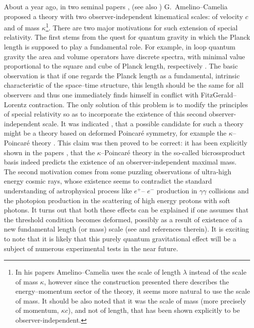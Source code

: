 \documentclass[a4paper,a4paper]{article}
\begin{document}
About a year ago, in two seminal papers \cite{gac1}, \cite{gac2}
(see also \cite{gacnew})  G.~Amelino--Camelia proposed a theory
with two observer-independent kinematical scales: of velocity $c$
and of mass $\kappa$\footnote{In his papers Amelino--Camelia  uses
the scale of length $\lambda$ instead of the scale of mass
$\kappa$, however since the construction presented there describes
the energy--momentum sector of the theory, it seems more natural
to use the scale of mass. It should be also noted that it was the
scale of mass (more precisely of momentum, $\kappa c$), and not of
length, that has been shown explicitly to be
observer-independent.}. There are two major motivations for such
extension of special relativity. The first stems from the quest
for quantum gravity in which the Planck length is supposed to play
a fundamental role. For example, in loop quantum gravity the area
and volume operators have discrete spectra, with minimal value
proportional to the square and cube of Planck length, respectively
\cite{RovSmo}. The basic observation is that if one regards the
Planck length as a fundamental, intrinsic characteristic of the
space--time structure, this length should be the same for all
observers and thus one immediately finds himself in conflict with
FitzGerald--Lorentz contraction. The only solution of this problem
is to modify the principles of special relativity so as to
incorporate the existence of this second observer-independent
scale. It was indicated \cite{gac1}, \cite{gac2} that a possible
candidate for such a theory might be a theory based on deformed
Poincar\'e symmetry, for example the $\kappa$--Poincar\'e theory
\cite{lunoruto, maru, luruto, luruza, luno}. This claim was then
proved to be correct: it has been explicitly shown in the papers
\cite{jkgminl}, \cite{rbgacjkg} that the $\kappa$--Poincar\'e
theory in the so-called bicrossproduct basis indeed predicts the
existence of an observer-independent maximal mass. The second
motivation comes from some puzzling observations of ultra-high
energy cosmic rays, whose existence seems to contradict the
standard understanding of astrophysical process like $e^+$-- $e^-$
production in $\gamma\gamma$ collisions and the photopion
production in the scattering of high energy protons with soft
photons. It turns out that both these effects can be explained if
one assumes that the threshold condition becomes deformed,
possibly as a result of existence of a new fundamental length (or
mass) scale (see \cite{gacpir} and references therein). It is
exciting to note that it is likely that this purely quantum
gravitational effect will be a subject of numerous experimental
tests in the near future.
\end{document}
